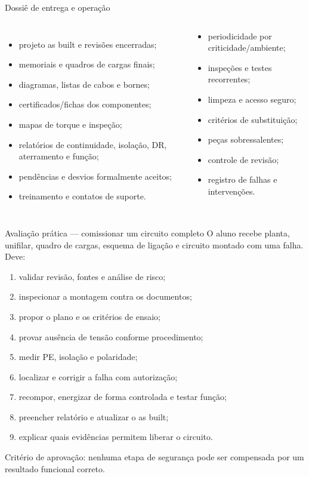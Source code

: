 \begin{frame}{Dossiê de entrega e operação}
\small
\begin{columns}[T,onlytextwidth]
\begin{itemize}
\item projeto as built e revisões encerradas;
\item memoriais e quadros de cargas finais;
\item diagramas, listas de cabos e bornes;
\item certificados/fichas dos componentes;
\item mapas de torque e inspeção;
\item relatórios de continuidade, isolação, DR, aterramento e função;
\item pendências e desvios formalmente aceitos;
\item treinamento e contatos de suporte.
\end{itemize}
\begin{caixaProjeto}[title=Plano de manutenção]
\begin{itemize}
\item periodicidade por criticidade/ambiente;
\item inspeções e testes recorrentes;
\item limpeza e acesso seguro;
\item critérios de substituição;
\item peças sobressalentes;
\item controle de revisão;
\item registro de falhas e intervenções.
\end{itemize}
\end{caixaProjeto}
\end{columns}
\end{frame}

\begin{frame}{Avaliação prática — comissionar um circuito completo}
\scriptsize
O aluno recebe planta, unifilar, quadro de cargas, esquema de ligação e circuito montado com uma falha. Deve:
\begin{enumerate}
\item validar revisão, fontes e análise de risco;
\item inspecionar a montagem contra os documentos;
\item propor o plano e os critérios de ensaio;
\item provar ausência de tensão conforme procedimento;
\item medir PE, isolação e polaridade;
\item localizar e corrigir a falha com autorização;
\item recompor, energizar de forma controlada e testar função;
\item preencher relatório e atualizar o as built;
\item explicar quais evidências permitem liberar o circuito.
\end{enumerate}
\begin{caixaAt}
Critério de aprovação: nenhuma etapa de segurança pode ser compensada por um resultado funcional correto.
\end{caixaAt}
\end{frame}
